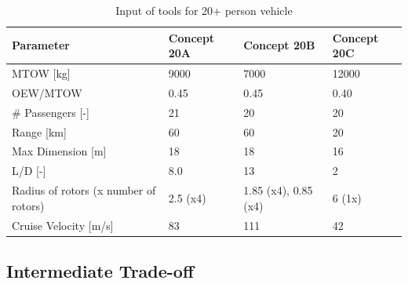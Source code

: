\begin{table}[H]
\centering
\captionsetup{justification=centering}
\caption{Input of tools for 20+ person vehicle}
\label{20input}
\begin{tabular}{@{}llll@{}}
\toprule
\textbf{Parameter}                       & \textbf{Concept 20A} & \textbf{Concept 20B} & \textbf{Concept 20C} \\ \midrule
MTOW {[}kg{]}                            &    9000                &       7000             &  12000                  \\
OEW/MTOW           &        0.45            &           0.45         &      0.40              \\
\# Passengers {[}-{]}                    &        21            &        20            &       20             \\
Range {[}km{]}                           &        60            &        60            &           20         \\
Max Dimension {[}m{]}                    &          18         &        18            &          16          \\
L/D {[}-{]}                              &         8.0           &        13            &     2               \\
Radius of rotors (x number of rotors)  &           2.5 (x4)         &   1.85 (x4), 0.85 (x4)                 &     6 (1x)               \\
Cruise Velocity {[}m/s{]}                &          83          &        111           &  42                 \\ \bottomrule
\end{tabular}

\end{table}


\subsection{Intermediate Trade-off}
\label{InterTO-20}


